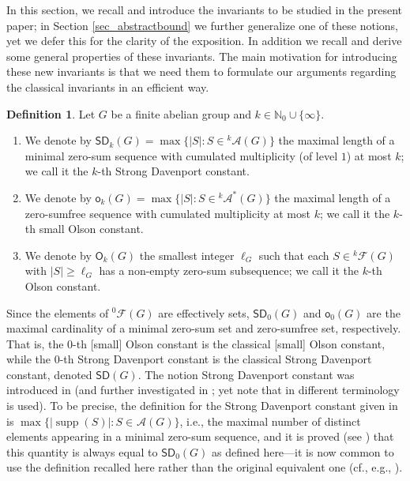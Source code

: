 \documentclass{amsart}
\theoremstyle{definition}
\newtheorem{df}[thm]{Definition}
\numberwithin{equation}{section}
\begin{document}
In this section, we recall and introduce the invariants to be studied in the present paper; in Section \ref{sec_abstractbound} we further generalize
one of these notions, yet we defer this for the clarity of the exposition.
In addition we recall and derive some general properties of these invariants.
The main motivation for introducing these new invariants is that we need them to formulate our arguments regarding the classical invariants in an efficient way.
\begin{df}
Let $G$ be a finite abelian group and $k \in \mathbb{N}_0 \cup \{\infty\}$.
\begin{enumerate}
\item We denote by
${\mathsf{SD}}_k(G)= \max \{ |S| \colon S \in {{}^{{k}}\!\mathcal{A}}(G) \}$ the maximal length of a minimal zero-sum sequence with cumulated multiplicity (of level $1$) at most $k$; we call it the $k$-th Strong Davenport constant.
\item We denote by ${\mathsf{o}}_k(G)= \max \{ |S| \colon S \in {{}^{{k}}\!\mathcal{A}^{\ast}}(G) \}$
the maximal length of a zero-sumfree sequence with cumulated multiplicity at most $k$; we call it the $k$-th small Olson constant.
\item We denote by ${\mathsf{O}}_k(G)$ the smallest integer $\ell_G$ such that
each $S\in {{}^{{k}}\!\mathcal{F}}(G)$ with $|S|\ge \ell_G$ has a non-empty zero-sum subsequence; we call it the $k$-th Olson constant.
\end{enumerate}
\end{df}
Since the elements of ${{}^{{0}}\!\mathcal{F}}(G)$ are effectively sets,  ${\mathsf{SD}}_0(G)$ and ${\mathsf{o}}_0(G)$ are
the maximal cardinality of a minimal zero-sum set and zero-sumfree set, respectively.
That is, the $0$-th [small] Olson constant is the classical [small] Olson constant, while
the $0$-th Strong Davenport constant is the classical Strong Davenport constant, denoted ${\mathsf{SD}}(G)$.
The notion Strong Davenport constant was introduced in \cite{CFS} (and further investigated in \cite{baliski,baginski}; yet note that in \cite{chabela}
different terminology is used). To be precise,
the definition for the Strong Davenport constant given in \cite{CFS} is
$\max \{|\operatorname{supp}(S)|\colon S \in {{}^{{}}\!\mathcal{A}} (G)\}$, i.e., the maximal number of distinct elements appearing in a minimal zero-sum sequence, and it is proved (see \cite{CFS}) that this quantity is always equal to ${\mathsf{SD}}_0(G)$ as defined here---it is now common to use the definition recalled here rather than
the original equivalent one (cf., e.g., \cite[Section 10]{GaoGe1}).
\end{document}
